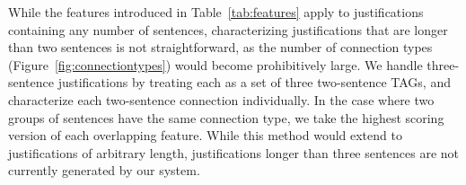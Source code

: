 While the features introduced in Table~\ref{tab:features} apply to justifications containing any number of sentences, characterizing justifications that are longer than two sentences is not straightforward, as the number of connection types (Figure~\ref{fig:connectiontypes}) would become prohibitively large.   We handle three-sentence justifications by treating each as a set of three two-sentence TAGs, and characterize each two-sentence connection individually.  In the case where two groups of sentences have the same connection type, we take the highest scoring version of each overlapping feature.  While this method would extend to justifications of arbitrary length,  justifications longer than three sentences are not currently generated by our system. 


